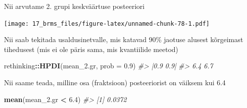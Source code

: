 \documentclass[]{book}
\newenvironment{Shaded}{\begin{snugshade}}{\end{snugshade}}
\newcommand{\KeywordTok}[1]{\textcolor[rgb]{0.13,0.29,0.53}{\textbf{#1}}}
\newcommand{\DataTypeTok}[1]{\textcolor[rgb]{0.13,0.29,0.53}{#1}}
\newcommand{\FloatTok}[1]{\textcolor[rgb]{0.00,0.00,0.81}{#1}}
\newcommand{\StringTok}[1]{\textcolor[rgb]{0.31,0.60,0.02}{#1}}
\newcommand{\CommentTok}[1]{\textcolor[rgb]{0.56,0.35,0.01}{\textit{#1}}}
\newcommand{\OtherTok}[1]{\textcolor[rgb]{0.56,0.35,0.01}{#1}}
\newcommand{\OperatorTok}[1]{\textcolor[rgb]{0.81,0.36,0.00}{\textbf{#1}}}
\newcommand{\NormalTok}[1]{#1}
\begin{document}
Nii arvutame 2. grupi keskväärtuse posteeriori

\begin{Shaded}
\end{Shaded}

\texttt{[image: 17\_brms\_files/figure-latex/unnamed-chunk-78-1.pdf]}

Nii saab tekitada usaldusinetvalle, mis katavad 90\% jaotuse alusest
kõrgeimast tihedusest (mis ei ole päris sama, mis kvantiilide meetod)

\begin{Shaded}
\begin{Highlighting}[]
\NormalTok{rethinking}\OperatorTok{::}\KeywordTok{HPDI}\NormalTok{(mean_}\FloatTok{2.}\NormalTok{gr, }\DataTypeTok{prob =} \FloatTok{0.9}\NormalTok{)}
\CommentTok{#> |0.9 0.9| }
\CommentTok{#>  6.4  6.7}
\end{Highlighting}
\end{Shaded}

\begin{Shaded}
\end{Shaded}

Nii saame teada, milline osa (fraktsioon) posteeriorist on väiksem kui
6.4

\begin{Shaded}
\begin{Highlighting}[]
\KeywordTok{mean}\NormalTok{(mean_}\FloatTok{2.}\NormalTok{gr }\OperatorTok{<}\StringTok{ }\FloatTok{6.4}\NormalTok{)}
\CommentTok{#> [1] 0.0372}
\end{Highlighting}
\end{Shaded}
\end{document}
